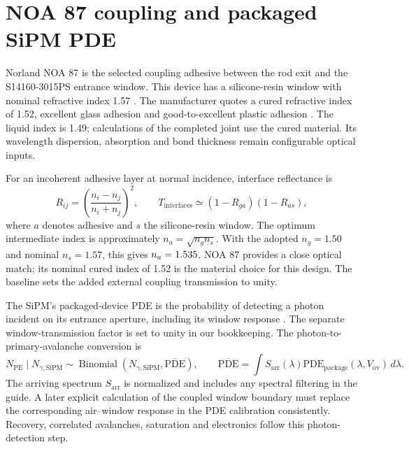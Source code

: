 \documentclass[11pt,a4paper]{article}
\newcommand{\num}[2][3]{\pgfmathprintnumber[fixed,precision=#1,fixed zerofill]{#2}}
\begin{document}
\section{NOA 87 coupling and packaged SiPM PDE}
Norland NOA 87 is the selected coupling adhesive between the rod exit and the
S14160-3015PS entrance window. This device has a silicone-resin window with
nominal refractive index 1.57 \cite{HamamatsuS14160SmallCells}.
The manufacturer quotes a cured refractive index of 1.52, excellent glass
adhesion and good-to-excellent plastic adhesion \cite{NorlandNOA87}.
The liquid index is 1.49; calculations of the completed joint use the cured
material. Its wavelength dispersion, absorption and bond thickness remain
configurable optical inputs.

For an incoherent adhesive layer at normal incidence, interface reflectance is
\begin{equation}
 R_{ij}=\left(\frac{n_i-n_j}{n_i+n_j}\right)^2,
 \qquad T_{\mathrm{interfaces}}\simeq(1-R_{ga})(1-R_{as}),
\end{equation}
where $a$ denotes adhesive and $s$ the silicone-resin window. The optimum
intermediate index is approximately $n_a=\sqrt{n_gn_s}$. With the adopted
$n_g=1.50$ and nominal $n_s=1.57$, this gives
$n_a=\num[3]{\elmOptimumGlueIndex}$. NOA 87 provides a close optical match;
its nominal cured index of 1.52 is the material choice for this design.
The baseline sets the added external coupling transmission to unity.

The SiPM's packaged-device PDE is the probability of detecting a photon
incident on its entrance aperture, including its window response
\cite{HamamatsuMPPCNote}. The separate window-transmission factor is set to
unity in our bookkeeping. The photon-to-primary-avalanche conversion is
\begin{equation}
 N_{\mathrm{PE}}\mid N_{\gamma,\mathrm{SiPM}}
 \sim\operatorname{Binomial}(N_{\gamma,\mathrm{SiPM}},\overline{\mathrm{PDE}}),
 \qquad
 \overline{\mathrm{PDE}}=\int S_{\mathrm{arr}}(\lambda)
 \mathrm{PDE}_{\mathrm{package}}(\lambda,V_{\mathrm{ov}})\,d\lambda.
\end{equation}
The arriving spectrum $S_{\mathrm{arr}}$ is normalized and includes any
spectral filtering in the guide. A later explicit calculation of the
coupled window boundary must replace the corresponding air--window response
in the PDE calibration consistently. Recovery, correlated avalanches,
saturation and electronics follow this photon-detection step.
\end{document}
